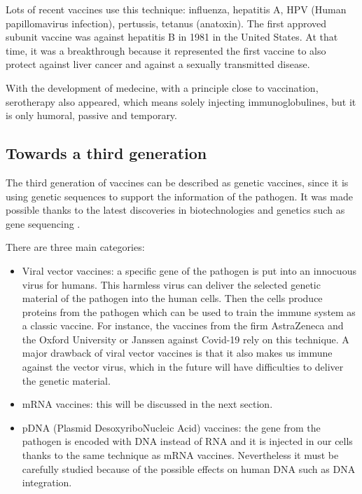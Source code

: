 \documentclass{article}
\begin{document}
            Lots of recent vaccines use this technique: influenza, hepatitis A, HPV (Human papillomavirus infection), pertussis, tetanus (anatoxin). 
                The first approved subunit vaccine was against hepatitis B in 1981 in the United States. 
                At that time, it was a breakthrough because it represented the first vaccine to also protect against liver cancer and against a sexually transmitted disease.

            With the development of medecine, with a principle close to vaccination,
                serotherapy also appeared, which means solely injecting immunoglobulines, but it is only humoral, passive and temporary.

        \subsection{Towards a third generation}

            The third generation of vaccines can be described as genetic vaccines, since it is using genetic sequences to support the information of the pathogen. 
            It was made possible thanks to the latest discoveries in biotechnologies and genetics such as gene sequencing \autocite{chavdaDNAVaccinesSARSCoV22021}.  

            There are three main categories:
            \begin{itemize}
                \item Viral vector vaccines: a specific gene of the pathogen is put into an innocuous virus for humans. 
                        This harmless virus can deliver the selected genetic material of the pathogen into the human cells.
                        Then the cells produce proteins from the pathogen which can be used to train the immune system as a classic vaccine.
                        For instance, the vaccines from the firm AstraZeneca and the Oxford University or Janssen against Covid-19 rely on this technique.
                        A major drawback of viral vector vaccines is that it also makes us immune against the vector virus, 
                            which in the future will have difficulties to deliver the genetic material.
                \item mRNA vaccines: this will be discussed in the next section.
                \item pDNA (Plasmid DesoxyriboNucleic Acid) vaccines: the gene from the pathogen is encoded with DNA instead of RNA
                    and it is injected in our cells thanks to the same technique as mRNA vaccines.
                    Nevertheless it must be carefully studied because of the possible effects on human DNA such as DNA integration.
            \end{itemize}
\end{document}
